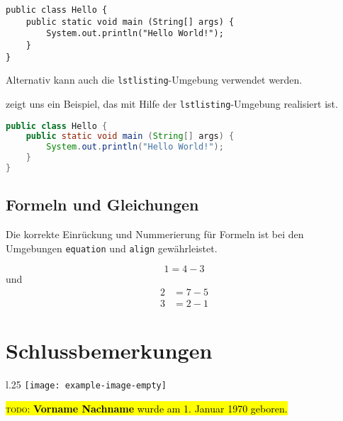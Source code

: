 \documentclass[utf8,biblatex,norunningheads]{lni}
\newcommand{\todo}[1]{\hl{\textsc{todo}: #1}}
\begin{document}
\begin{verbatim}
public class Hello {
    public static void main (String[] args) {
        System.out.println("Hello World!");
    }
}
\end{verbatim}

Alternativ kann auch die \texttt{lstlisting}-Umgebung verwendet werden.

 zeigt uns ein Beispiel, das mit Hilfe der \texttt{lstlisting}-Umgebung realisiert ist.

\begin{lstlisting}[caption={Beschreibung}, label=L1, language=Java]
public class Hello {
    public static void main (String[] args) {
        System.out.println("Hello World!");
    }
}
\end{lstlisting}

\subsection{Formeln und Gleichungen}

Die korrekte Einrückung und Nummerierung für Formeln ist bei den Umgebungen
\texttt{equation} und \texttt{align} gewährleistet.

\begin{equation}
  1=4-3
\end{equation}
und
\begin{align}
  2&=7-5\\
  3&=2-1
\end{align}

\section{Schlussbemerkungen}

\blindtext

\printbibliography

\begin{wrapfigure}{l}{.25\textwidth}
\texttt{[image: example-image-empty]}
\end{wrapfigure}
\noindent\todo{\textbf{Vorname Nachname} wurde am 1. Januar 1970 geboren.} \blindtext
\end{document}
